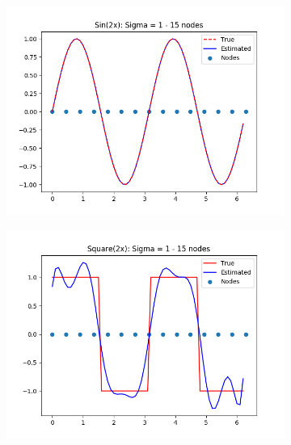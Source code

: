 \documentclass{article}
\begin{document}
\begin{figure}[ht!]
\begin{subfigure}[t]{0.4\textwidth}
        \includegraphics[width=1\textwidth]{plots/batch/best_sin2x.png}
        \caption{}
    \end{subfigure}
        \begin{subfigure}[t]{0.4\textwidth}
        \includegraphics[width=1\textwidth]{plots/batch/best_square2x.png}
        \caption{}
    \end{subfigure}
\end{figure}
\end{document}

